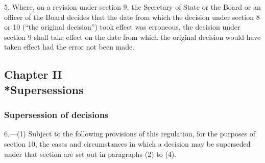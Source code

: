\documentclass[12pt,a4paper]{article}
\begin{document}
5.  Where, on a revision under section 9, the Secretary of State
or the Board or an officer of the Board  %
decides that the date from which the decision under section 8 or 10 (“the original decision”) took effect was erroneous, the decision under section 9 shall take effect on the date from which the original decision would have taken effect had the error not been made.


\subsection[Chapter II --- Supersessions]{Chapter II\\*Supersessions}

\subsubsection[6. Supersession of decisions]{Supersession of decisions}

\renewcommand\parthead{--- Part II Chapter II}

6.—(1) Subject to the following provisions of this regulation, for the purposes of section 10, the cases and circumstances in which a decision may be superseded under that section are set out in paragraphs (2) to (4).
\end{document}
